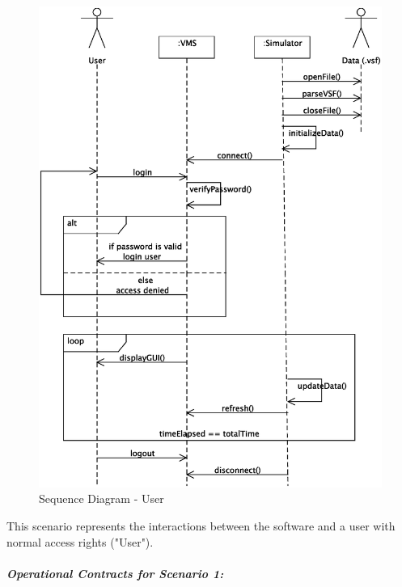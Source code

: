 \documentclass{article}
\begin{document}
\begin{figure}[!htb]
\caption{Sequence Diagram - User}
\centering
\includegraphics[scale=0.5]{diagrams/user-sequence-diagram.eps}
\end{figure}

This scenario represents the interactions between the software and a user with normal access rights ("User").

\subparagraph{Operational Contracts for Scenario 1:}
\end{document}
